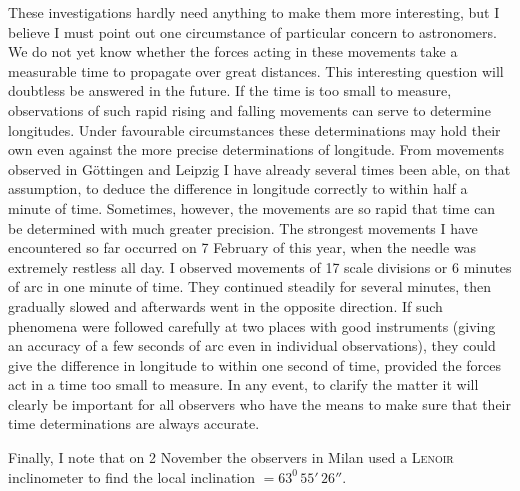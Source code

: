 These investigations hardly need anything to make them more interesting, but I believe I must point out one circumstance of particular concern to astronomers. We do not yet know whether the forces acting in these movements take a measurable time to propagate over great distances. This interesting question will doubtless be answered in
the future. If the time is too small to measure, observations of such rapid rising and falling movements can serve to determine longitudes. Under favourable circumstances these determinations may hold their own even against the more precise determinations of longitude. From movements observed in Göttingen and Leipzig I have already several times been able, on that assumption, to deduce the difference in longitude correctly to within half a minute of time. Sometimes, however, the movements are so rapid that time can be determined with much greater precision. The strongest movements I have encountered so far occurred on 7 February of this year, when the needle was extremely restless all day. I observed movements of 17 scale divisions or 6 minutes of arc in one minute of time. They continued steadily for several minutes, then gradually slowed and afterwards went in the opposite direction. If such phenomena were followed carefully at two places with good instruments (giving an accuracy of a few seconds of arc even in individual observations), they could give the difference in longitude to within one second of time, provided the forces act in a time too small to measure. In any event, to clarify the matter it will clearly be important for all observers who have the means to make sure that their time determinations are always accurate.

Finally, I note that on 2 November the observers in Milan used a \textsc{Lenoir} inclinometer to find the local inclination $=63^0\,55'\,26''$.


